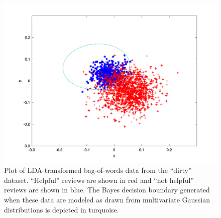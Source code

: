 \begin{figure}[!htbp]
\begin{center}
\includegraphics[width=\textwidth]{img/dirty_boundary.pdf}
\caption{
Plot of LDA-transformed bag-of-words data from the ``dirty'' dataset.
``Helpful'' reviews are shown in red and ``not helpful'' reviews are shown in blue.
The Bayes decision boundary generated when these data are modeled as drawn from multivariate Gaussian distributions is depicted in turquoise.
}
\label{fig:dirty_boundary}
\end{center}
\end{figure}
